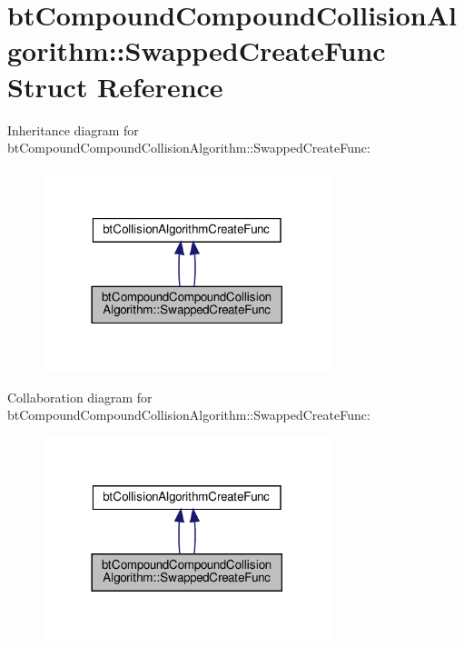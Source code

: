\hypertarget{structbtCompoundCompoundCollisionAlgorithm_1_1SwappedCreateFunc}{}\section{bt\+Compound\+Compound\+Collision\+Algorithm\+:\+:Swapped\+Create\+Func Struct Reference}
\label{structbtCompoundCompoundCollisionAlgorithm_1_1SwappedCreateFunc}


Inheritance diagram for bt\+Compound\+Compound\+Collision\+Algorithm\+:\+:Swapped\+Create\+Func\+:
\nopagebreak
\begin{figure}[H]
\begin{center}
\leavevmode
\includegraphics[width=237pt]{structbtCompoundCompoundCollisionAlgorithm_1_1SwappedCreateFunc__inherit__graph}
\end{center}
\end{figure}


Collaboration diagram for bt\+Compound\+Compound\+Collision\+Algorithm\+:\+:Swapped\+Create\+Func\+:
\nopagebreak
\begin{figure}[H]
\begin{center}
\leavevmode
\includegraphics[width=237pt]{structbtCompoundCompoundCollisionAlgorithm_1_1SwappedCreateFunc__coll__graph}
\end{center}
\end{figure}
